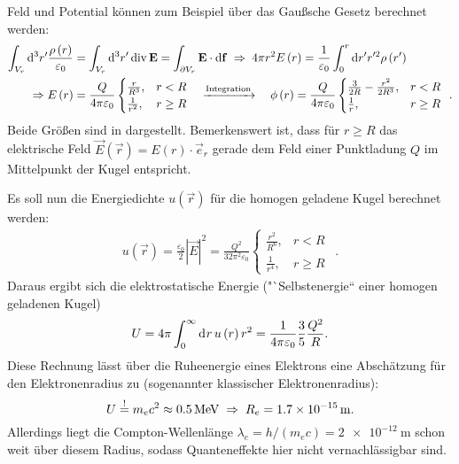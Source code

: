 Feld und Potential können zum Beispiel über das Gaußsche Gesetz berechnet werden:
\begin{align*}
	\int _{{V_{r}}}\mathop{}\!\mathrm{d} ^{3}r'\frac{\rho \left(r\right)}{\varepsilon _{0}} & =\int _{{V_{r}}}\mathop{}\!\mathrm{d} ^{3}r'\operatorname{div} \mathbf{E}=\int _{\partial {V_{r}}}\mathbf{E}\cdot \mathop{}\!\mathrm{d} \mathbf{f}\;\Rightarrow\; 4\pi r^{2}E\left(r\right)=\frac{1}{\varepsilon _{0}}\int _{0}^{r}\mathop{}\!\mathrm{d} r'r'^{2}\rho \left(r'\right) \\
	\Rightarrow E\left(r\right)                                             & =\frac{Q}{4\pi \varepsilon _{0}}
	\begin{cases} \frac{r}{R^{3}}, & r<R     \\
              \frac{1}{r^{2}}, & r\geq R
	\end{cases} \quad\xrightarrow{\text{Integration}}\quad \phi \left(r\right)=\frac{Q}{4\pi \varepsilon _{0}}
	\begin{cases} \frac{3}{2R}-\frac{r^{2}}{2R^{3}}, & r<R     \\
              \frac{1}{r},                       & r\geq R
	\end{cases}\:\:.
\end{align*}
Beide Größen sind in  dargestellt. Bemerkenswert ist, dass für $r\geq R$ das elektrische Feld $\vec {E}\left(\vec {r}\right)=E\left(r\right)\cdot \vec {e}_{r}$ gerade dem Feld einer Punktladung $Q$ im Mittelpunkt der Kugel entspricht.

Es soll nun die Energiedichte $u\left(\vec {r}\right)$ für die homogen geladene Kugel berechnet werden:
\begin{align*}
	u\left(\vec {r}\right)=\frac{\varepsilon _{0}}{2}\left| \vec {E}\right| ^{2}=\frac{Q^{2}}{32\pi ^{2}\varepsilon _{0}}\begin{cases} \frac{r^{2}}{R^{6}}, & r<R     \\
              \frac{1}{r^{4}},     & r\geq R
	                                                                                                                     \end{cases}\:\:.
\end{align*}
Daraus ergibt sich die elektrostatische Energie ("`Selbstenergie`` einer homogen geladenen Kugel)
\begin{equation*}
	U=4\pi \int _{0}^{\infty }\mathop{\mathrm{d}^{}r}u\left(r\right)r^{2}=\frac{1}{4\pi \varepsilon _{0}}\frac{3}{5}\frac{Q^{2}}{R}.
\end{equation*}
Diese Rechnung lässt über die Ruheenergie eines Elektrons eine Abschätzung für den Elektronenradius zu (sogenannter klassischer Elektronenradius):
\begin{equation*}
	U\overset{!}{=} m_{e}c^{2}\approx \SI{0.5}{\mega\eV}\implication R_{e}= \SI{1,7e-15}{\m}.
\end{equation*}
Allerdings liegt die Compton-Wellenlänge $\lambda _{e}=h/({m_{e}c})=\SI{2e-12}{\m}$ schon weit über diesem Radius, sodass Quanteneffekte hier nicht vernachlässigbar sind.



